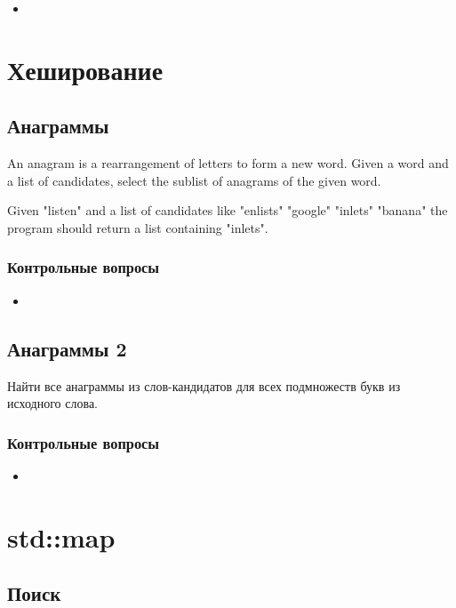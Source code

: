 \documentclass[10pt,twoside,openany]{book}
\begin{document}
\begin{itemize}
    \item
\end{itemize}

\chapter{Хеширование}

\section{Анаграммы}

An anagram is a rearrangement of letters to form a new word.
Given a word and a list of candidates, select the sublist of anagrams of the given word.

Given "listen" and a list of candidates like "enlists" "google" "inlets" "banana"
the program should return a list containing "inlets".

\subsection*{Контрольные вопросы}

\begin{itemize}
    \item
\end{itemize}

\section{Анаграммы 2}

Найти все анаграммы из слов-кандидатов для всех подмножеств букв из исходного слова.

\subsection*{Контрольные вопросы}

\begin{itemize}
    \item
\end{itemize}

\chapter{std::map}

\section{Поиск}
\end{document}
